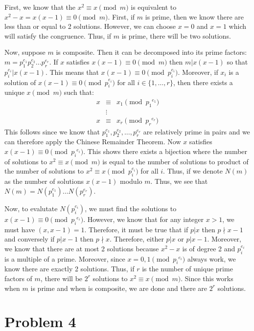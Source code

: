 \documentclass[psamsfonts]{amsart}
\newenvironment{sol}{{\bfseries Solution}}{\qedsymbol}
\theoremstyle{definition}
\theoremstyle{remark}
\numberwithin{equation}{section}
\begin{document}
\begin{sol}
First, we know that the $x^2 \equiv x \pmod{m}$ is equivalent to $x^2 - x = x (x - 1) \equiv 0 \pmod{m}$. First, if $m$ is prime, then we know there are less than or equal to 2 solutions. However, we can choose $x = 0$ and $x = 1$ which will satisfy the congruence. Thus, if $m$ is prime, there will be two solutions. 

Now, suppose $m$ is composite. Then it can be decomposed into its prime factors: $m = p_1^{e_1} p_2^{e_2} \ldots p_r^{e_r}$. If $x$ satisfies $x(x-1) \equiv 0 \pmod{m}$ then $m | x(x-1)$ so that $p_i^{e_i} | x(x-1)$. This means that $x(x-1) \equiv 0 \pmod{p_i^{e_i}}$. Moreover, if $x_i$ is a solution of $x(x-1) \equiv 0 \pmod{p_i^{e_i}}$ for all $i \in \{1, \ldots, r\}$, then there exists a unique $x \pmod{m}$ such that:
\begin{eqnarray}
x &\equiv& x_1 \pmod{{p_1}^{e_1}} \\
&\vdots& \\
x &\equiv& x_r \pmod{{p_r}^{e_r}}
\end{eqnarray}
This follows since we know that $p_1^{e_1}, p_2^{e_2}, \ldots, p_r^{e_r}$ are relatively prime in pairs and we can therefore apply the Chinese Remainder Theorem. Now $x$ satisfies $x(x-1) \equiv 0 \pmod{{p_i}^{e_i}}$. This shows there exists a bijection where the number of solutions to $x^2 \equiv x \pmod{m}$ is equal to the number of solutions to product of the number of solutions to $x^2 \equiv x \pmod{p_i^{e_i}}$ for all $i$. Thus, if we denote $N(m)$ as the number of solutions $x(x-1)$ modulo $m$. Thus, we see that $N(m) = N(p_1^{e_1}) \ldots N(p_r^{e_r})$. 

Now, to evalutate $N(p_i^{e_i})$, we must find the solutions to $x(x-1) \equiv 0 \pmod{p_i}^{e_i}$. However, we know that for any integer $x > 1$, we must have $(x, x-1) = 1$. Therefore, it must be true that if $p | x$ then $p \nmid x - 1$ and conversely if $p | x- 1$ then $p \nmid x$. Therefore, either $p | x$ or $p | x - 1$. Moreover, we know that there are at most 2 solutions because $x^2 - x$ is of degree 2 and $p_i^{e_i}$ is a multiple of a prime. Moreover, since $x = 0, 1 \pmod {p_i}^{e_i}$ always work, we know there are exactly 2 solutions. Thus, if $r$ is the number of unique prime factors of $m$, there will be $2^r$ solutions to $x^2 \equiv x \pmod{m}$. Since this works when $m$ is prime and when is composite, we are done and there are $2^r$ solutions. 
\end{sol}

\section{Problem 4}
\end{document}
